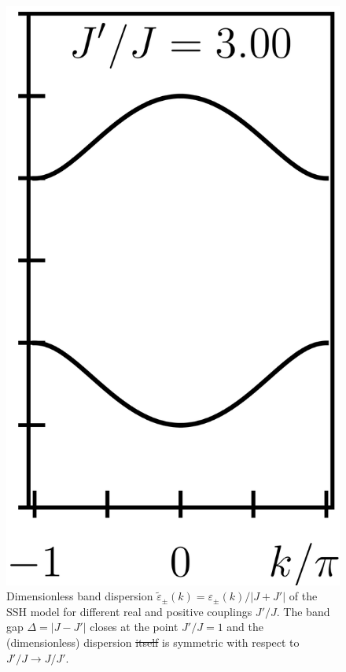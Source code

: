 \documentclass{svmono}
\providecommand{\DIFaddtex}[1]{{\protect\color{blue}\uwave{#1}}} %
\providecommand{\DIFdeltex}[1]{{\protect\color{red}\sout{#1}}}                      %
\providecommand{\DIFaddFL}[1]{\DIFadd{#1}} %
\providecommand{\DIFdelFL}[1]{\DIFdel{#1}} %
\providecommand{\DIFaddbeginFL}{} %
\providecommand{\DIFaddendFL}{} %
\providecommand{\DIFdelbeginFL}{} %
\providecommand{\DIFdelendFL}{} %
\providecommand{\DIFadd}[1]{\texorpdfstring{\DIFaddtex{#1}}{#1}} %
\providecommand{\DIFdel}[1]{\texorpdfstring{\DIFdeltex{#1}}{}} %
\newcommand{\DIFscaledelfig}{0.5}
\newlength{\DIFdelgraphicswidth} %
\newlength{\DIFdelgraphicsheight} %
\newcommand{\DIFaddincludegraphics}[2][]{{\color{blue}\fbox{\DIFOincludegraphics[#1]{#2}}}} %
\newcommand{\DIFdelincludegraphics}[2][]{%
\sbox{\DIFdelgraphicsbox}{\DIFOincludegraphics[#1]{#2}}%
\settoboxwidth{\DIFdelgraphicswidth}{\DIFdelgraphicsbox} %
\settoboxtotalheight{\DIFdelgraphicsheight}{\DIFdelgraphicsbox} %
\scalebox{\DIFscaledelfig}{%
\parbox[b]{\DIFdelgraphicswidth}{\usebox{\DIFdelgraphicsbox}\\[-\baselineskip] \rule{\DIFdelgraphicswidth}{0em}}\llap{\resizebox{\DIFdelgraphicswidth}{\DIFdelgraphicsheight}{%
\setlength{\unitlength}{\DIFdelgraphicswidth}%
\begin{picture}(1,1)%
\thicklines\linethickness{2pt} %
{\color[rgb]{1,0,0}\put(0,0){\framebox(1,1){}}}%
{\color[rgb]{1,0,0}\put(0,0){\line( 1,1){1}}}%
{\color[rgb]{1,0,0}\put(0,1){\line(1,-1){1}}}%
\end{picture}%
}\hspace*{3pt}}} %
} %
\DeclareRobustCommand{\DIFaddbeginFL}{\DIFOaddbeginFL \let\includegraphics\DIFaddincludegraphics} %
\DeclareRobustCommand{\DIFaddendFL}{\DIFOaddendFL \let\includegraphics\DIFOincludegraphics} %
\DeclareRobustCommand{\DIFdelbeginFL}{\DIFOdelbeginFL \let\includegraphics\DIFdelincludegraphics} %
\DeclareRobustCommand{\DIFdelendFL}{\DIFOaddendFL \let\includegraphics\DIFOincludegraphics} %
\begin{document}
\begin{figure}[ht]
    \includegraphics{figures/cropped_ssh_dispersion_3.png}
    \caption{Dimensionless band dispersion $\tilde\varepsilon_\pm(k)=\varepsilon_\pm(k)/|J+J'|$ of the SSH model for different real and positive couplings $J'/J$. The band gap \DIFdelbeginFL \DIFdelFL{$\Delta=|J-J'|$ }\DIFdelendFL \DIFaddbeginFL \DIFaddFL{$\Delta=2|J-J'|$ }\DIFaddendFL closes at the point $J'/J=1$ and the (dimensionless) dispersion \DIFdelbeginFL \DIFdelFL{itself }\DIFdelendFL is symmetric with respect to $J'/J\rightarrow J/J'$.}
    \label{fig:ssh_dispersion}
\end{figure}
\end{document}
